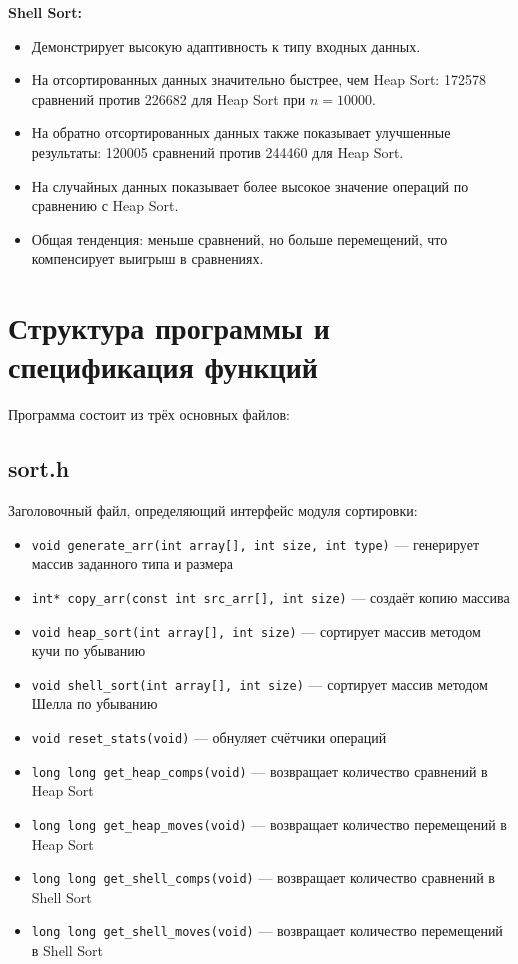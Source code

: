 \documentclass[a4paper,12pt,titlepage]{article}
\begin{document}
\textbf{Shell Sort:}
\begin{itemize}
    \item Демонстрирует высокую адаптивность к типу входных данных.
    \item На отсортированных данных значительно быстрее, чем Heap Sort: 172578 сравнений против 226682 для Heap Sort при $n = 10000$.
    \item На обратно отсортированных данных также показывает улучшенные результаты: 120005 сравнений против 244460 для Heap Sort.
    \item На случайных данных показывает более высокое значение операций по сравнению с Heap Sort.
    \item Общая тенденция: меньше сравнений, но больше перемещений, что компенсирует выигрыш в сравнениях.
\end{itemize}



\section{Структура программы и спецификация функций}

Программа состоит из трёх основных файлов:

\subsection{sort.h}

Заголовочный файл, определяющий интерфейс модуля сортировки:

\begin{itemize}
    \item \texttt{void generate\_arr(int array[], int size, int type)} — генерирует массив заданного типа и размера
    \item \texttt{int* copy\_arr(const int src\_arr[], int size)} — создаёт копию массива
    \item \texttt{void heap\_sort(int array[], int size)} — сортирует массив методом кучи по убыванию
    \item \texttt{void shell\_sort(int array[], int size)} — сортирует массив методом Шелла по убыванию
    \item \texttt{void reset\_stats(void)} — обнуляет счётчики операций
    \item \texttt{long long get\_heap\_comps(void)} — возвращает количество сравнений в Heap Sort
    \item \texttt{long long get\_heap\_moves(void)} — возвращает количество перемещений в Heap Sort
    \item \texttt{long long get\_shell\_comps(void)} — возвращает количество сравнений в Shell Sort
    \item \texttt{long long get\_shell\_moves(void)} — возвращает количество перемещений в Shell Sort
\end{itemize}
\end{document}
